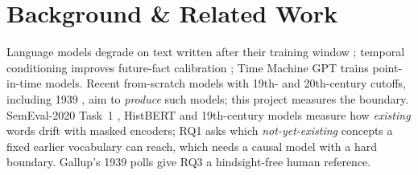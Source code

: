 \documentclass[final]{article}
\let\oldsection\section
\renewcommand{\section}{\vspace{-0.3em}\oldsection}
\begin{document}
\section*{Background \& Related Work}
Language models degrade on text written after their training window
\citep{lazaridou2021}; temporal conditioning improves future-fact calibration
\citep{dhingra2022}; Time Machine GPT \citep{drinkall2024} trains
point-in-time models. Recent from-scratch
models with 19th- and 20th-century cutoffs, including 1939
\citep{timecapsule2025,ranke2025,talkie2026}, aim to \emph{produce} such
models; this project measures the boundary. SemEval-2020
Task~1 \citep{schlechtweg2020}, HistBERT \citep{qiu2022} and 19th-century
models \citep{hosseini2021} measure how \emph{existing} words drift with masked
encoders; RQ1 asks which \emph{not-yet-existing} concepts a fixed earlier
vocabulary can reach, which needs a causal model with a hard boundary.
Gallup's 1939 polls \citep{gallup1939} give RQ3 a hindsight-free human
reference.
\end{document}
